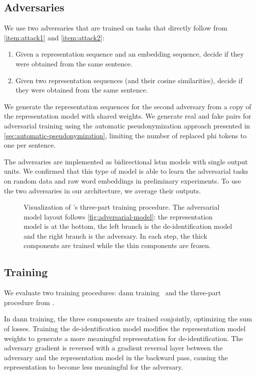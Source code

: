 \subsection{Adversaries}
%
We use two adversaries that are trained on tasks that directly follow from \ref{item:attack1} and \ref{item:attack2}:
\begin{enumerate}[label=T\arabic*.,ref=T\arabic*]
    \item Given a representation sequence and an embedding sequence, decide if they were obtained from the same sentence.
    \item Given two representation sequences (and their cosine similarities), decide if they were obtained from the same sentence.
\end{enumerate}
%
We generate the representation sequences for the second adversary from a copy of the representation model with shared weights.
%
We generate real and fake pairs for adversarial training using the automatic pseudonymization approach presented in \cref{sec:automatic-pseudonymization}, limiting the number of replaced \ac{phi} tokens to one per sentence.

%
The adversaries are implemented as bidirectional \ac{lstm} models with single output units.
%
We confirmed that this type of model is able to learn the adversarial tasks on random data and raw word embeddings in preliminary experiments.
%
To use the two adversaries in our architecture, we average their outputs.

 \begin{figure}
    \centering
    
    \caption[Adversarial training procedure]{%
        Visualization of \citeauthor{feutry2018learning}'s three-part training procedure.
        The adversarial model layout follows \cref{fig:adversarial-model}: the representation model is at the bottom, the left branch is the de-identification model and the right branch is the adversary.
        In each step, the thick components are trained while the thin components are frozen.
    }\label{fig:feutry-training}
\end{figure}

\subsection{Training}
%
We evaluate two training procedures: \ac{dann} training~\citep{ganin2016domain} and the three-part procedure from \citet{feutry2018learning}.

%
In \ac{dann} training, the three components are trained conjointly, optimizing the sum of losses.
%
Training the de-identification model modifies the representation model weights to generate a more meaningful representation for de-identification.
%
The adversary gradient is reversed with a gradient reversal layer between the adversary and the representation model in the backward pass, causing the representation to become less meaningful for the adversary.

